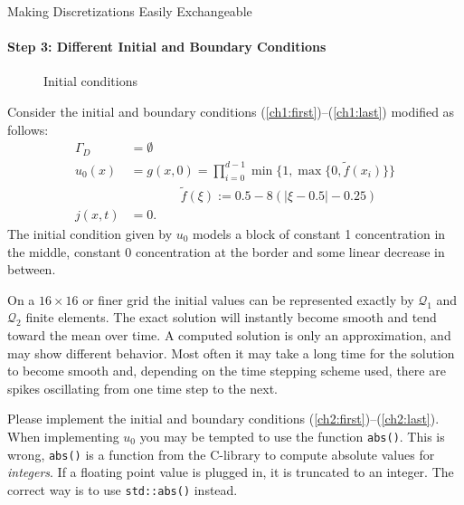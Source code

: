 \documentclass[12pt,a4paper]{article}
\begin{document}
\begin{Exercise}{Making Discretizations Easily Exchangeable}
  \paragraph{Step 3: Different Initial and Boundary Conditions}
  \quad \newline
  \begin{wrapfigure}[9]{l}{4.5cm}
    \centering
    \caption{Initial conditions}
  \end{wrapfigure}
  Consider the initial and boundary conditions
  (\ref{ch1:first})--(\ref{ch1:last}) modified as follows:
  \begin{align}
    \label{ch2:first}
    \Gamma_D&=\emptyset \\
    u_0(x) &= g(x, 0) = \prod_{i=0}^{d-1}\min\{1,\max\{0,\tilde{f}(x_i)\}\} \\
        & \qquad\qquad \tilde{f}(\xi):=0.5-8(|\xi-0.5|-0.25) \nonumber \\
    \label{ch2:last}
    j(x,t)&=0 .
  \end{align}
  The initial condition given by $u_0$ models a block of constant 1
  concentration in the middle, constant 0 concentration at the border
  and some linear decrease in between.

  On a $16\times16$ or finer grid the initial values can be represented
  exactly by $\mathcal{Q}_1$ and $\mathcal{Q}_2$ finite elements.
  The exact solution will instantly
  become smooth and tend toward the mean over time.  A computed solution is
  only an approximation, and may show different behavior.  Most often it may
  take a long time for the solution to become smooth and, depending on
  the time stepping scheme used, there are spikes oscillating from one
  time step to the next.

  Please implement the initial and boundary conditions
  (\ref{ch2:first})--(\ref{ch2:last}). When implementing $u_0$
  you may be tempted to use the function \lstinline!abs()!. This is
  wrong, \lstinline!abs()! is a function from the C-library to compute
  absolute values for \emph{integers}. If a floating point value is
  plugged in, it is truncated to an integer. The correct way is to use
  \lstinline!std::abs()! instead.


\end{Exercise}
\end{document}

